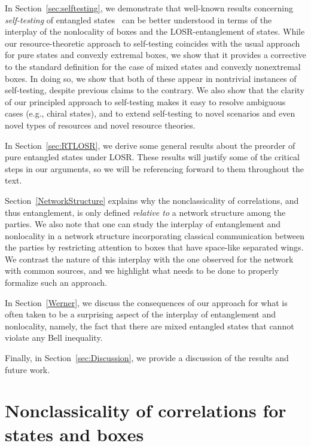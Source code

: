 \documentclass[prx,11pt,letterpaper,twocolumn,accepted=2023-11-27]{quantumarticle}
\theoremstyle{plain}
\theoremstyle{definition}
\begin{document}
In Section~\ref{sec:selftesting}, we demonstrate that well-known results concerning {\em self-testing} of entangled states~\cite{mayers1998quantum,mayers2003self,vsupic2020self,Scarani2019}  can be better understood in terms of the interplay of the nonlocality of boxes and the LOSR-entanglement of states.
While our resource-theoretic approach to self-testing coincides with the usual approach for pure states and convexly extremal boxes, we show that it provides a corrective to the standard definition for the case of mixed states and convexly nonextremal boxes. In doing so, we show that both of these appear in nontrivial instances of self-testing, despite previous claims to the contrary. We also show that the clarity of our principled approach to self-testing makes it easy to resolve ambiguous cases (e.g., chiral states), and to extend self-testing to novel scenarios and even novel types of resources and novel resource theories.

In Section~\ref{sec:RTLOSR}, we derive some general results about the preorder of pure entangled states under LOSR. These results will justify some of the critical steps in our arguments, so we will be referencing forward to them throughout the text.


Section~\ref{NetworkStructure} 
explains
 why the nonclassicality of correlations, and thus entanglement, is only defined {\em relative to} a network structure among the parties. We also note that one can study the interplay of entanglement and nonlocality in a network structure incorporating classical communication between the parties by restricting attention to  boxes that have space-like separated wings.  We contrast the nature of this interplay with the one observed for the network with common sources, and we highlight what needs to be done to properly formalize such an approach.

In Section~\ref{Werner}, we discuss the consequences of our approach for what is often taken to be a surprising aspect of the interplay of entanglement and nonlocality, namely, the fact that there are mixed entangled states that cannot violate any Bell inequality. 

 Finally, in Section~\ref{sec:Discussion}, we provide a discussion of the results and future work.


\section{Nonclassicality of correlations for states and boxes}\label{sec:unifiedRT}
\end{document}
